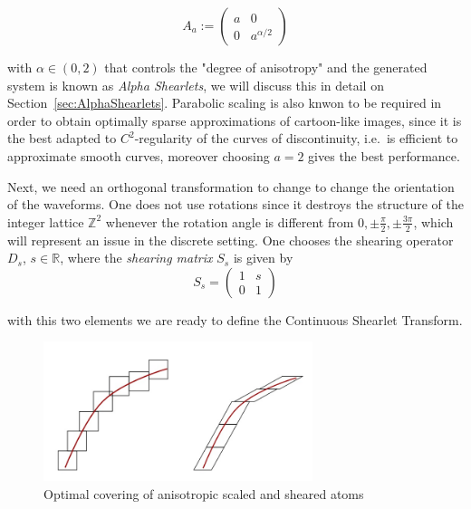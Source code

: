 \begin{equation}
\label{eq:scalingalpha}
A_a:=
\left(
\begin{matrix}
a & 0 \\
0 & a^{\alpha/2}
\end{matrix}
\right)
\end{equation}

with $\alpha\in (0,2)$ that controls the "degree of anisotropy" and the generated system is known as \textit{Alpha Shearlets}, we will discuss this in detail on Section~\ref{sec:AlphaShearlets}. Parabolic scaling is also knwon to be required in order to obtain optimally sparse approximations of cartoon-like images, since it is the best adapted to $C^2$-regularity of the curves of discontinuity, i.e.\ is efficient to approximate smooth curves, moreover choosing $a=2$ gives the best performance.

\bigskip

 Next, we need an orthogonal transformation to change to change the orientation of the waveforms. One does not use rotations since it destroys the structure of the integer lattice $\mathbb{Z}^2$ whenever the rotation angle is different from $0,\pm\frac{\pi}{2},\pm\frac{3\pi}{2}$, which will represent an issue in the discrete setting. One chooses the shearing operator $D_s$, $s\in\mathbb{R}$, where the \textit{shearing matrix} $S_s$ is given by 
\begin{equation}
\label{eq:shearing}
S_s=
\left(
\begin{matrix}
1 & s \\
0 & 1
\end{matrix}
\right)
\end{equation}

with this two elements we are ready to define the Continuous Shearlet Transform.

\begin{figure}[h!]
\centering
\includegraphics[width = 0.7\textwidth]{./Diagrams/anisotropic_isotropic.jpg}
\caption{Optimal covering of anisotropic scaled and sheared atoms}
\label{edges-images}
\end{figure}

